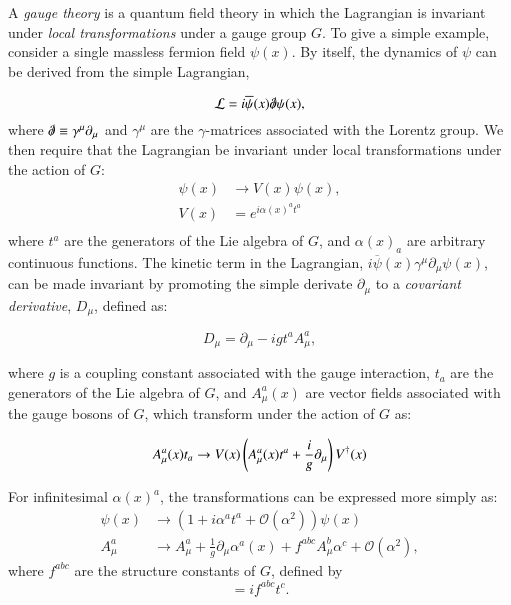 A \emph{gauge theory} is a quantum field theory in which the Lagrangian is invariant under \emph{local transformations} under a gauge group $G$. To give a simple example, consider a single massless fermion field $\psi(x)$. By itself, the dynamics of $\psi$ can be derived from the simple Lagrangian,

\begin{equation}
	\mathcal{L} = i\overline{\psi}(x) \slashed{\partial} \psi(x),
\end{equation}
where $\slashed{\partial}\equiv \gamma^{\mu}\partial_{\mu}$ and $\gamma^{\mu}$ are the $\gamma$-matrices associated with the Lorentz group. We then require that the Lagrangian be invariant under local transformations under the action of $G$:
 \begin{align*}
 	\psi(x) &\rightarrow V(x) \psi(x), \\
 	V(x) &= e^{i\alpha(x)^a t^a} \\
 \end{align*}
 where $t^a$ are the generators of the Lie algebra of $G$, and $\alpha(x)_a$ are arbitrary continuous functions. The kinetic term in the Lagrangian, $i\overline{\psi}(x)\gamma^{\mu}\partial_{\mu}\psi(x)$, can be made invariant by promoting the simple derivate $\partial_{\mu}$ to a \emph{covariant derivative}, $D_{\mu}$, defined as:

\begin{equation}\label{eqn:covariant-derivative-qcd}
	D_{\mu} = \partial_{\mu} - i g t^a A^a_{\mu},
\end{equation}

where $g$ is a coupling constant associated with the gauge interaction, $t_a$ are the generators of the Lie algebra of $G$, and $A^a_{\mu}(x)$ are vector fields associated with the gauge bosons of $G$, which transform under the action of $G$ as:

\begin{equation}
	A^a_{\mu}(x)t_a \rightarrow V(x) \left(A^a_{\mu}(x)t^a + \frac{i}{g} \partial_{\mu}\right) V^{\dagger}(x) \\
\end{equation}

For infinitesimal $\alpha(x)^a$, the transformations can be expressed more simply as:
\begin{align}
	\psi(x)&\rightarrow (1 + i\alpha^a t^a + \mathcal{O}(\alpha^2))\psi(x) \\
	A^a_{\mu} &\rightarrow A_{\mu}^a + \frac{1}{g}\partial_{\mu}\alpha^a(x) + f^{abc}A^b_{\mu}\alpha^c + \mathcal{O}(\alpha^2),
\end{align}
where $f^{abc}$ are the structure constants of $G$, defined by
\begin{equation}
	[t^a,\ t^b] = if^{abc}t^c.
\end{equation}

